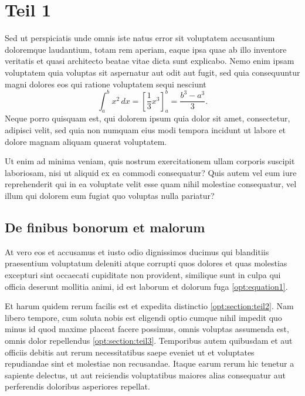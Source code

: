 %
%
%
%
\section{Teil 1
\label{opt:section:teil1}}
Sed ut perspiciatis unde omnis iste natus error sit voluptatem
accusantium doloremque laudantium, totam rem aperiam, eaque ipsa
quae ab illo inventore veritatis et quasi architecto beatae vitae
dicta sunt explicabo.
Nemo enim ipsam voluptatem quia voluptas sit aspernatur aut odit
aut fugit, sed quia consequuntur magni dolores eos qui ratione
voluptatem sequi nesciunt
\begin{equation}
\int_a^b x^2\, dx
=
\left[ \frac13 x^3 \right]_a^b
=
\frac{b^3-a^3}3.
\label{opt:equation1}
\end{equation}
Neque porro quisquam est, qui dolorem ipsum quia dolor sit amet,
consectetur, adipisci velit, sed quia non numquam eius modi tempora
incidunt ut labore et dolore magnam aliquam quaerat voluptatem.

Ut enim ad minima veniam, quis nostrum exercitationem ullam corporis
suscipit laboriosam, nisi ut aliquid ex ea commodi consequatur?
Quis autem vel eum iure reprehenderit qui in ea voluptate velit
esse quam nihil molestiae consequatur, vel illum qui dolorem eum
fugiat quo voluptas nulla pariatur?

\subsection{De finibus bonorum et malorum
\label{opt:subsection:finibus}}
At vero eos et accusamus et iusto odio dignissimos ducimus qui
blanditiis praesentium voluptatum deleniti atque corrupti quos
dolores et quas molestias excepturi sint occaecati cupiditate non
provident, similique sunt in culpa qui officia deserunt mollitia
animi, id est laborum et dolorum fuga \eqref{opt:equation1}.

Et harum quidem rerum facilis est et expedita distinctio
\ref{opt:section:teil2}.
Nam libero tempore, cum soluta nobis est eligendi optio cumque nihil
impedit quo minus id quod maxime placeat facere possimus, omnis
voluptas assumenda est, omnis dolor repellendus
\ref{opt:section:teil3}.
Temporibus autem quibusdam et aut officiis debitis aut rerum
necessitatibus saepe eveniet ut et voluptates repudiandae sint et
molestiae non recusandae.
Itaque earum rerum hic tenetur a sapiente delectus, ut aut reiciendis
voluptatibus maiores alias consequatur aut perferendis doloribus
asperiores repellat.


